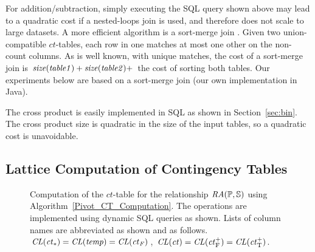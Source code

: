 \documentclass{acm_proc_article-sp}
\newcommand{\ct}{\mathit{ct}}
\begin{document}
For addition/subtraction, simply executing the SQL query shown above %
may lead to a quadratic cost if a nested-loops join is used, and therefore does not scale to large datasets.
A more efficient algorithm is a sort-merge join \cite{Ullman1982}. 
Given two union-compatible $\ct$-tables, each row in one matches at most one other on the non-count columns. 
As is well known, with unique matches, the cost of a sort-merge join is $\it{size}(table1) + \it{size}(table2) +$ the cost of sorting both tables. 
Our experiments below are based on a sort-merge join (our own implementation in Java). 

The cross product is easily implemented in SQL as shown in Section~\ref{sec:bin}. The cross product size is quadratic in the size of the input tables, so a quadratic cost is unavoidable.

\subsection{Lattice Computation of Contingency Tables} \label{sec:mobius}
\begin{figure}[tb]
\begin{center}

\caption{Computation of the $\ct$-table for the relationship $\mathit{RA}(\mathbb{P},\mathbb{S})$ using Algorithm~\ref{Pivot_CT_Computation}. The operations are implemented using dynamic SQL queries as shown. Lists of column names are abbreviated as shown and as follows.
$\ColumnList({\ct_{*}}) = \ColumnList({temp})=\ColumnList({\ct_{F}})$, 
$\ColumnList({\ct}) =  \ColumnList(\ct_{\false}^{+})  = \ColumnList(\ct_{\true}^{+}) $.
\label{fig:flow}}
\end{center}
\end{figure}
\end{document}
